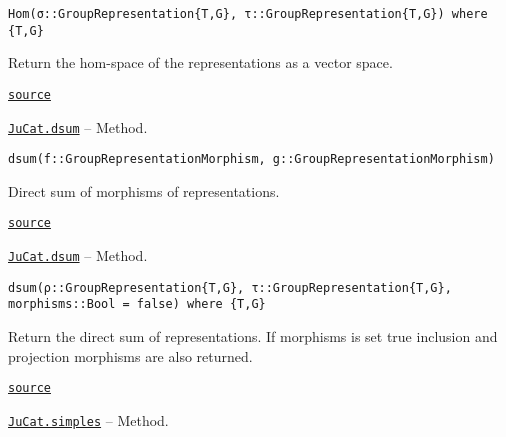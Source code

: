\documentclass{memoir}
\begin{document}
\begin{adjustwidth}{2em}{0pt}


\begin{verbatim}
Hom(σ::GroupRepresentation{T,G}, τ::GroupRepresentation{T,G}) where {T,G}
\end{verbatim}

Return the hom-space of the representations as a vector space.



\href{https://github.com/FabianMaeurer/JuCat.jl/blob/367390e2d003deec2ababa73caeab405e934bb35/src/structures/Representations/GroupRepresentations.jl#L442-L446}{\texttt{source}}


\end{adjustwidth}
\hypertarget{11633833845246005104}{} 
\hyperlink{11633833845246005104}{\texttt{JuCat.dsum}}  -- {Method.}

\begin{adjustwidth}{2em}{0pt}


\begin{verbatim}
dsum(f::GroupRepresentationMorphism, g::GroupRepresentationMorphism)
\end{verbatim}

Direct sum of morphisms of representations.



\href{https://github.com/FabianMaeurer/JuCat.jl/blob/367390e2d003deec2ababa73caeab405e934bb35/src/structures/Representations/GroupRepresentations.jl#L351-L355}{\texttt{source}}


\end{adjustwidth}
\hypertarget{13403022418623350768}{} 
\hyperlink{13403022418623350768}{\texttt{JuCat.dsum}}  -- {Method.}

\begin{adjustwidth}{2em}{0pt}


\begin{verbatim}
dsum(ρ::GroupRepresentation{T,G}, τ::GroupRepresentation{T,G}, morphisms::Bool = false) where {T,G}
\end{verbatim}

Return the direct sum of representations. If morphisms is set true inclusion and projection morphisms are also returned.



\href{https://github.com/FabianMaeurer/JuCat.jl/blob/367390e2d003deec2ababa73caeab405e934bb35/src/structures/Representations/GroupRepresentations.jl#L312-L317}{\texttt{source}}


\end{adjustwidth}
\hypertarget{17037802207135643902}{} 
\hyperlink{17037802207135643902}{\texttt{JuCat.simples}}  -- {Method.}
\end{document}
